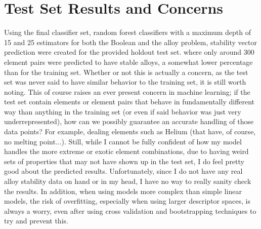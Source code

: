 \documentclass[11pt]{article}
\begin{document}
\section{Test Set Results and Concerns}
\noindent 
Using the final classifier set, random forest classifiers with a maximum depth of 15 and 25 estimators for both the Boolean and the alloy problem, stability vector prediction were created for the provided holdout test set. where only around 300 element pairs were predicted to have stable alloys, a somewhat lower percentage than for the training set. Whether or not this is actually a concern, as the test set was never said to have similar behavior to the training set, it is still worth noting. This of course raises an ever present concern in machine learning; if the test set contain elements or element pairs that behave in fundamentally different way than anything in the training set (or even if said behavior was just very underrepresented), how can we possibly guarantee an accurate handling of those data points? For example, dealing elements such as Helium (that have, of course, no melting point...). Still, while I cannot be fully confident of how my model handles the more extreme or exotic element combinations, due to having weird sets of properties that may not have shown up in the test set, I do feel pretty good about the predicted results. Unfortunately, since I do not have any real alloy stability data on hand or in my head, I have no way to really sanity check the results. In addition, when using models more complex than simple linear models, the risk of overfitting, especially when using larger descriptor spaces, is always a worry, even after using cross validation and bootstrapping techniques to try and prevent this. 
\end{document}
